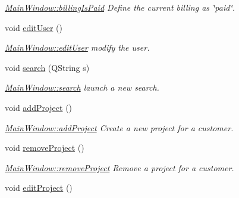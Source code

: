 \begin{DoxyCompactItemize}
\begin{DoxyCompactList}\small\item\em \hyperlink{classGui_1_1MainWindow_a149c8e2210fa249c0510e1f607079fde}{Main\-Window\-::billing\-Is\-Paid} Define the current billing as \char`\"{}paid\char`\"{}. \end{DoxyCompactList}\item 
void \hyperlink{classGui_1_1MainWindow_a5dfb182cf52eb48f71e70cd193ef7a8b}{edit\-User} ()
\begin{DoxyCompactList}\small\item\em \hyperlink{classGui_1_1MainWindow_a5dfb182cf52eb48f71e70cd193ef7a8b}{Main\-Window\-::edit\-User} modify the user. \end{DoxyCompactList}\item 
void \hyperlink{classGui_1_1MainWindow_af50656b4c43aa53bae1ac4a3d6b4c953}{search} (Q\-String s)
\begin{DoxyCompactList}\small\item\em \hyperlink{classGui_1_1MainWindow_af50656b4c43aa53bae1ac4a3d6b4c953}{Main\-Window\-::search} launch a new search. \end{DoxyCompactList}\item 
void \hyperlink{classGui_1_1MainWindow_acc49a5a35dfc7eb8f835ff425618e2d9}{add\-Project} ()
\begin{DoxyCompactList}\small\item\em \hyperlink{classGui_1_1MainWindow_acc49a5a35dfc7eb8f835ff425618e2d9}{Main\-Window\-::add\-Project} Create a new project for a customer. \end{DoxyCompactList}\item 
\hypertarget{classGui_1_1MainWindow_aff6f88facb002c942273170d3543bb54}{void \hyperlink{classGui_1_1MainWindow_aff6f88facb002c942273170d3543bb54}{remove\-Project} ()}\label{classGui_1_1MainWindow_aff6f88facb002c942273170d3543bb54}

\begin{DoxyCompactList}\small\item\em \hyperlink{classGui_1_1MainWindow_aff6f88facb002c942273170d3543bb54}{Main\-Window\-::remove\-Project} Remove a project for a customer. \end{DoxyCompactList}\item 
\hypertarget{classGui_1_1MainWindow_a80af8e18d89a51a3368a65fb22e02040}{void \hyperlink{classGui_1_1MainWindow_a80af8e18d89a51a3368a65fb22e02040}{edit\-Project} ()}\label{classGui_1_1MainWindow_a80af8e18d89a51a3368a65fb22e02040}


\end{DoxyCompactItemize}
